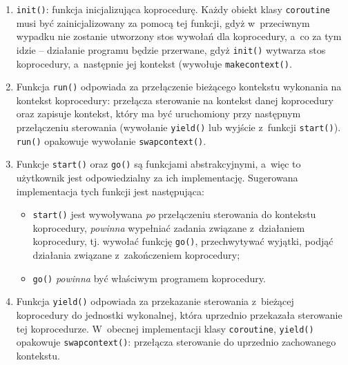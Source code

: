 \documentclass[12pt]{mwart}
\newcommand{\code}{\texttt}
\newcommand{\procbr}{()}
\newcommand{\function}[1]{\code{#1\procbr}}
\begin{document}
  \begin{enumerate}
    \item \function{init}: funkcja inicjalizująca koprocedurę. Każdy obiekt klasy \code{coroutine} musi być zainicjalizowany za pomocą tej funkcji,
      gdyż w~przeciwnym wypadku nie zostanie utworzony stos wywołań dla koprocedury, a~co za tym idzie -- działanie programu będzie przerwane, gdyż
      \function{init} wytwarza stos koprocedury, a~następnie jej kontekst (wywołuje \function{makecontext}.
    \item Funkcja \function{run} odpowiada za przełączenie bieżącego kontekstu wykonania na kontekst koprocedury: przełącza sterowanie na kontekst danej koprocedury oraz zapisuje kontekst,
      który ma być uruchomiony przy następnym przełączeniu sterowania (wywołanie \function{yield} lub wyjście z~funkcji \function{start}). \function{run} opakowuje 
      wywołanie \function{swapcontext}.
    \item Funkcje \function{start} oraz \function{go} są funkcjami abstrakcyjnymi, a~więc to użytkownik jest odpowiedzialny za ich implementację.
      Sugerowana implementacja tych funkcji jest następująca:
      \begin{itemize}
        \item \function{start} jest wywoływana \emph{po} przełączeniu sterowania do kontekstu koprocedury, \emph{powinna} wypełniać zadania
          związane z~działaniem koprocedury, tj. wywołać funkcję \function{go}, przechwytywać wyjątki, podjąć działania związane z~zakończeniem koprocedury;
        \item \function{go} \emph{powinna} być właściwym programem koprocedury.
      \end{itemize}
    \item Funkcja \function{yield} odpowiada za przekazanie sterowania z~bieżącej koprocedury do jednostki wykonalnej, która uprzednio przekazała sterowanie 
      tej koprocedurze. W~obecnej implementacji klasy \code{coroutine}, \function{yield} opakowuje \function{swapcontext}: przełącza sterowanie do uprzednio zachowanego kontekstu.
  \end{enumerate}
\par
%
\end{document}
